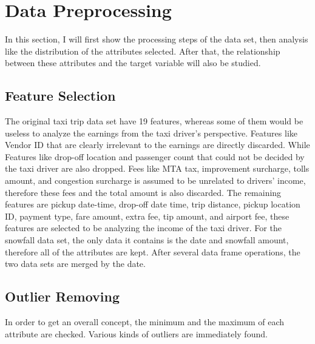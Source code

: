\documentclass[11pt]{article}
\begin{document}

\section{Data Preprocessing}
In this section, I will first show the processing steps of the data set, then analysis like the distribution of the attributes selected. After that, the relationship between these attributes and the target variable will also be studied. 

\subsection{Feature Selection}
The original taxi trip data set have 19 features, whereas some of them would be useless to analyze the earnings from the taxi driver's perspective. Features like Vendor ID that are clearly irrelevant to the earnings are directly discarded. While Features like drop-off location and passenger count that could not be decided by the taxi driver are also dropped. Fees like MTA tax, improvement surcharge, tolls amount, and congestion surcharge is assumed to be unrelated to drivers' income, therefore these fees and the total amount is also discarded. The remaining features are pickup date-time, drop-off date time, trip distance, pickup location ID, payment type, fare amount, extra fee, tip amount, and airport fee, these features are selected to be analyzing the income of the taxi driver. For the snowfall data set, the only data it contains is the date and snowfall amount, therefore all of the attributes are kept. After several data frame operations, the two data sets are merged by the date.

\subsection{Outlier Removing}
In order to get an overall concept, the minimum and the maximum of each attribute are checked. Various kinds of outliers are immediately found.
\end{document}
